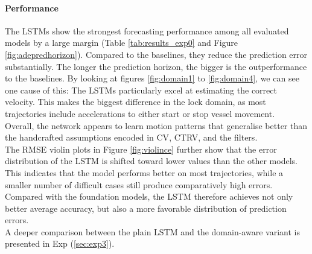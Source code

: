                     \paragraph{Performance}
                    The \acp{LSTM} show the strongest forecasting performance among all evaluated models by a large margin (Table \ref{tab:results_exp0} and Figure \ref{fig:adepredhorizon}). Compared to the baselines, they reduce the prediction error substantially. The longer the prediction horizon, the bigger is the outperformance to the baselines. By looking at figures \ref{fig:domain1} to \ref{fig:domain4}, we can see one cause of this: The \acp{LSTM} particularly excel at estimating the correct velocity. This makes the biggest difference in the lock domain, as most trajectories include accelerations to either start or stop vessel movement.\\ Overall, the network appears to learn motion patterns that generalise better than the handcrafted assumptions encoded in \ac{CV}, CTRV, and the filters.\\
                    The \ac{RMSE} violin plots in Figure \ref{fig:violince} further show that the error distribution of the \ac{LSTM} is shifted toward lower values than the other models. This indicates that the model performs better on most trajectories, while a smaller number of difficult cases still produce comparatively high errors. Compared with the foundation models, the LSTM therefore achieves not only better average accuracy, but also a more favorable distribution of prediction errors.\\                    
                    A deeper comparison between the plain \ac{LSTM} and the domain-aware variant is presented in Exp  (\ref{sec:exp3}).

